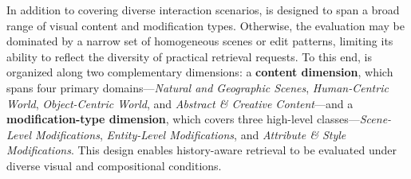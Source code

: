 In addition to covering diverse interaction scenarios, \Mybenchmark is designed to span a broad range of visual content and modification types. Otherwise, the evaluation may be dominated by a narrow set of homogeneous scenes or edit patterns, limiting its ability to reflect the diversity of practical retrieval requests. To this end, \Mybenchmark is organized along two complementary dimensions: a \textbf{content dimension}, which spans four primary domains---\textit{Natural and Geographic Scenes}, \textit{Human-Centric World}, \textit{Object-Centric World}, and \textit{Abstract \& Creative Content}---and a \textbf{modification-type dimension}, which covers three high-level classes---\textit{Scene-Level Modifications}, \textit{Entity-Level Modifications}, and \textit{Attribute \& Style Modifications}. This design enables history-aware retrieval to be evaluated under diverse visual and compositional conditions.





